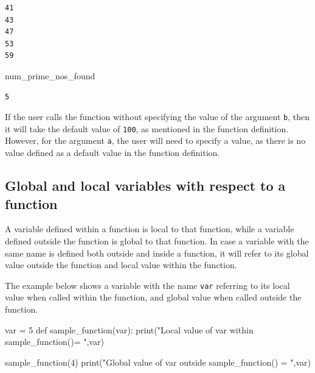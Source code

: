 \documentclass[
  letterpaper,
  DIV=11,
  numbers=noendperiod]{scrreprt}
\newenvironment{Shaded}{\begin{snugshade}}{\end{snugshade}}
\newcommand{\BuiltInTok}[1]{\textcolor[rgb]{0.00,0.23,0.31}{#1}}
\newcommand{\DecValTok}[1]{\textcolor[rgb]{0.68,0.00,0.00}{#1}}
\newcommand{\KeywordTok}[1]{\textcolor[rgb]{0.00,0.23,0.31}{#1}}
\newcommand{\NormalTok}[1]{\textcolor[rgb]{0.00,0.23,0.31}{#1}}
\newcommand{\OperatorTok}[1]{\textcolor[rgb]{0.37,0.37,0.37}{#1}}
\newcommand{\StringTok}[1]{\textcolor[rgb]{0.13,0.47,0.30}{#1}}
\begin{document}
\begin{verbatim}
41
43
47
53
59
\end{verbatim}

\begin{Shaded}
\begin{Highlighting}[]
\NormalTok{num\_prime\_nos\_found}
\end{Highlighting}
\end{Shaded}

\begin{verbatim}
5
\end{verbatim}

If the user calls the function without specifying the value of the
argument \texttt{b}, then it will take the default value of
\texttt{100}, as mentioned in the function definition. However, for the
argument \texttt{a}, the user will need to specify a value, as there is
no value defined as a default value in the function definition.

\hypertarget{global-and-local-variables-with-respect-to-a-function}{%
\subsection{Global and local variables with respect to a
function}\label{global-and-local-variables-with-respect-to-a-function}}

A variable defined within a function is local to that function, while a
variable defined outside the function is global to that function. In
case a variable with the same name is defined both outside and inside a
function, it will refer to its global value outside the function and
local value within the function.

The example below shows a variable with the name \texttt{var} referring
to its local value when called within the function, and global value
when called outside the function.

\begin{Shaded}
\begin{Highlighting}[]
\NormalTok{var }\OperatorTok{=} \DecValTok{5}
\KeywordTok{def}\NormalTok{ sample\_function(var):    }
    \BuiltInTok{print}\NormalTok{(}\StringTok{"Local value of \textquotesingle{}var\textquotesingle{} within \textquotesingle{}sample\_function()\textquotesingle{}= "}\NormalTok{,var)}

\NormalTok{sample\_function(}\DecValTok{4}\NormalTok{)}
\BuiltInTok{print}\NormalTok{(}\StringTok{"Global value of \textquotesingle{}var\textquotesingle{} outside \textquotesingle{}sample\_function()\textquotesingle{} = "}\NormalTok{,var)}
\end{Highlighting}
\end{Shaded}
\end{document}
